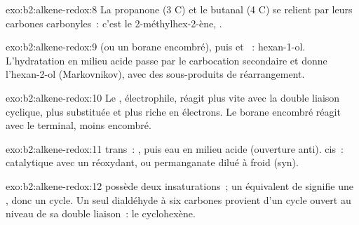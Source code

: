 \begin{solution}{exo:b2:alkene-redox:8}
La propanone (3 C) et le butanal (4 C) se relient par leurs carbones carbonyles~: c'est le
2-méthylhex-2-ène, .
\end{solution}

\begin{solution}{exo:b2:alkene-redox:9}
 (ou un borane encombré), puis  et ~: hexan-1-ol. L'hydratation en milieu acide
passe par le carbocation secondaire et donne l'hexan-2-ol (Markovnikov), avec des
sous-produits de réarrangement.
\end{solution}

\begin{solution}{exo:b2:alkene-redox:10}
Le , électrophile, réagit plus vite avec la double liaison cyclique, plus substituée et plus riche
en électrons. Le borane encombré réagit avec le  terminal, moins encombré.
\end{solution}

\begin{solution}{exo:b2:alkene-redox:11}
trans~: , puis eau en milieu acide (ouverture anti). cis~:  catalytique avec un
réoxydant, ou permanganate dilué à froid (syn).
\end{solution}

\begin{solution}{exo:b2:alkene-redox:12}
 possède deux insaturations~; un équivalent de  signifie une , donc
un cycle. Un seul dialdéhyde à six carbones provient d'un cycle ouvert au niveau de sa double liaison~:
le cyclohexène.
\end{solution}


